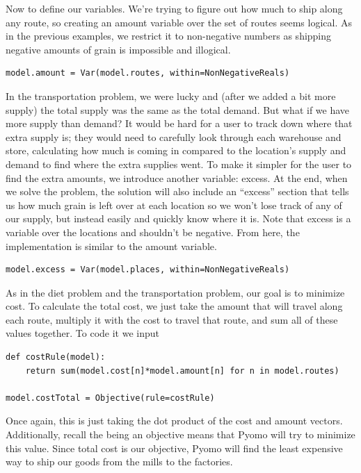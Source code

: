 \documentclass{article}
\begin{document}
Now to define our variables.  We're trying to figure out how much to ship along any route, so creating an amount variable over the set of routes seems logical.  As in the previous examples, we restrict it to non-negative numbers as shipping negative amounts of grain is impossible and illogical.

\begin{verbatim}
model.amount = Var(model.routes, within=NonNegativeReals)
\end{verbatim}

In the transportation problem, we were lucky and (after we added a bit more supply) the total supply was the same as the total demand.  But what if we have more supply than demand?  It would be hard for a user to track down where that extra supply is; they would need to carefully look through each warehouse and store, calculating how much is coming in compared to the location's supply and demand to find where the extra supplies went.  To make it simpler for the user to find the extra amounts, we introduce another variable: excess.  At the end, when we solve the problem, the solution will also include an ``excess'' section that tells us how much grain is left over at each location so we won't lose track of any of our supply, but instead easily and quickly know where it is.  Note that excess is a variable over the locations and shouldn't be negative.  From here, the implementation is similar to the amount variable.

\begin{verbatim}
model.excess = Var(model.places, within=NonNegativeReals)
\end{verbatim}

As in the diet problem and the transportation problem, our goal is to minimize cost.  To calculate the total cost, we just take the amount that will travel along each route, multiply it with the cost to travel that route, and sum all of these values together.  To code it we input

\begin{verbatim}
def costRule(model):
    return sum(model.cost[n]*model.amount[n] for n in model.routes)

model.costTotal = Objective(rule=costRule)
\end{verbatim}

\noindent
Once again, this is just taking the dot product of the cost and amount vectors.  Additionally, recall the being an objective means that Pyomo will try to minimize this value.  Since total cost is our objective, Pyomo will find the least expensive way to ship our goods from the mills to the factories.
\end{document}
